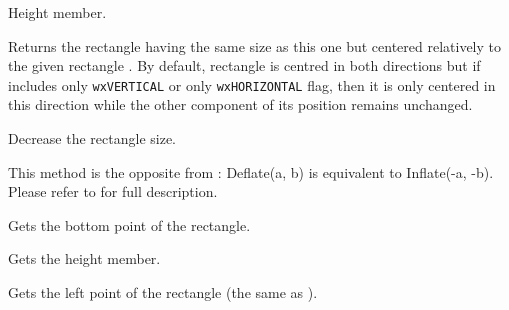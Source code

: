 
Height member.


\label{wxrectcentrein}



Returns the rectangle having the same size as this one but centered relatively
to the given rectangle . By default, rectangle is centred in both
directions but if  includes only \texttt{wxVERTICAL} or only 
\texttt{wxHORIZONTAL} flag, then it is only centered in this direction while
the other component of its position remains unchanged.


\label{wxrectdeflate}




Decrease the rectangle size.

This method is the opposite from :
Deflate(a, b) is equivalent to Inflate(-a, -b).
Please refer to  for full description.




\label{wxrectgetbottom}


Gets the bottom point of the rectangle.


\label{wxrectgetheight}


Gets the height member.


\label{wxrectgetleft}


Gets the left point of the rectangle (the same as ).


\label{wxrectgetposition}


